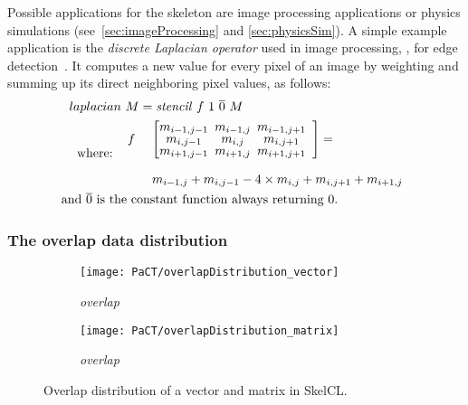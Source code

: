 Possible applications for the \stencil skeleton are image processing applications or physics simulations (see~\autoref{sec:imageProcessing} and \autoref{sec:physicsSim}).
A simple example application is the \emph{discrete Laplacian operator} used in image processing, \eg, for edge detection~\cite{Umbaugh1997}.
It computes a new value for every pixel of an image by weighting and summing up its direct neighboring pixel values, as follows:
\begin{align*}
  laplacian&\ M = \stencil\ f\ 1\ \overline{0}\ M\\
  \text{where:} \ \ &
  \begin{array}{ll}%
  f&\ \left[\begin{array}{ccc}%
      \hspace{-.5em} m_{i-1,j-1}& \hspace{-.5em} m_{i-1,j} & \hspace{-.5em}m_{i-1,j+1}\vspace{-.25em}\\%
      \hspace{-.5em} m_{i,j-1}  & \hspace{-.5em} m_{i,j}   & \hspace{-.5em}m_{i,j+1}  \vspace{-.25em}\\%
      \hspace{-.5em} m_{i+1,j-1}& \hspace{-.5em} m_{i+1,j} & \hspace{-.5em}m_{i+1,j+1}
    \end{array}\right] = \\[2em]
          &\ m_{i-1,j} + m_{i,j-1} - 4 \times m_{i,j} + m_{i,j+1} + m_{i+1,j}
  \end{array} \\
  \text{and } \overline{0} \text{ is th}&\text{e constant function always returning $0$.}
\end{align*}

\subsubsection{The overlap data distribution}
\label{section:overlap}

\begin{figure}[tb]
  \centering
  \begin{subfigure}[b]{.3\textwidth}
    \texttt{[image: PaCT/overlapDistribution\_vector]}
    \caption{\emph{overlap}}
    \label{fig:overlap_distribution}
  \end{subfigure}
  \hspace{3em}
  \begin{subfigure}[b]{.22\textwidth}
    \texttt{[image: PaCT/overlapDistribution\_matrix]}
    \caption{\emph{overlap}}
    \label{fig:overlap_distribution:matrix}
  \end{subfigure}
  \caption{Overlap distribution of a vector and matrix in SkelCL.}
  \label{fig:overlap_distribution}
  \bigskip
\end{figure}

